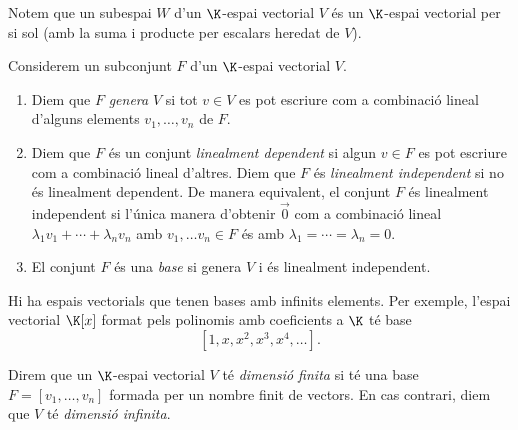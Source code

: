 \begin{observacio}
    Notem que un subespai $W$ d'un $\K$-espai vectorial $V$ és un $\K$-espai vectorial per si sol (amb la suma i producte per escalars heredat de $V$).
\end{observacio}

\begin{definicio}
Considerem un subconjunt $F$ d'un $\K$-espai vectorial $V$.
    \begin{enumerate}
        \item Diem que $F$ \emph{genera} $V$ si tot $v\in V$ es pot escriure com a combinació lineal d'alguns elements $v_1,\ldots, v_n$ de $F$.
        \item Diem que $F$ és un conjunt \emph{linealment dependent} si algun $v\in F$ es pot escriure com a combinació lineal d'altres. Diem que $F$ és \emph{linealment independent} si no és linealment dependent. De manera equivalent, el conjunt $F$ és linealment independent si l'única manera d'obtenir $\vec 0$ com a combinació lineal $\lambda_1v_1+\cdots+ \lambda_nv_n$ amb $v_1,\ldots v_n\in F$ és amb $\lambda_1=\cdots=\lambda_n=0$.
        \item El conjunt $F$ és una \emph{base} si genera $V$ i és linealment independent.
    \end{enumerate}
\end{definicio}

\begin{observacio}
    Hi ha espais vectorials que tenen bases amb infinits elements. Per exemple, l'espai vectorial $\K[x]$ format pels polinomis amb coeficients a $\K$ té base
    \[
    [1,x,x^2,x^3,x^4,\ldots].
    \]
\end{observacio}
\begin{definicio}
Direm que un $\K$-espai vectorial $V$ té \emph{dimensió finita} si té una base $F=[v_1,\ldots,v_n]$ formada per un nombre finit de vectors. En cas contrari, diem que $V$ té \emph{dimensió infinita}.
\end{definicio}


